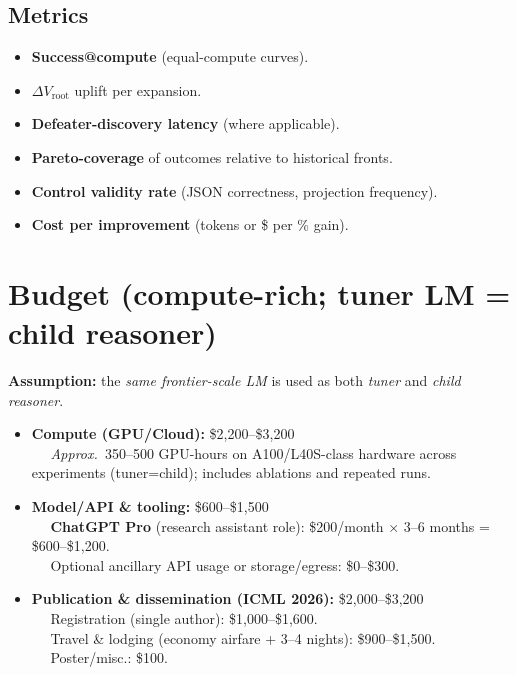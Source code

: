 \documentclass[11pt]{article}
\begin{document}
\subsection{Metrics}
\begin{itemize}[leftmargin=1.2em]
  \item \textbf{Success@compute} (equal-compute curves).
  \item \textbf{$\Delta V_{\text{root}}$} uplift per expansion.
  \item \textbf{Defeater-discovery latency} (where applicable).
  \item \textbf{Pareto-coverage} of outcomes relative to historical fronts.
  \item \textbf{Control validity rate} (JSON correctness, projection frequency).
  \item \textbf{Cost per improvement} (tokens or \$ per \% gain).
\end{itemize}

\section{Budget (compute-rich; tuner LM = child reasoner)}
\textbf{Assumption:} the \emph{same frontier-scale LM} is used as both \emph{tuner} and \emph{child reasoner}.

\begin{itemize}[leftmargin=1.2em]
  \item \textbf{Compute (GPU/Cloud):} \$2{,}200--\$3{,}200 \\
  $\quad$ \emph{Approx.\ }350--500 GPU-hours on A100/L40S-class hardware across experiments (tuner=child); includes ablations and repeated runs.

  \item \textbf{Model/API \& tooling:} \$600--\$1{,}500 \\
  $\quad$ \textbf{ChatGPT Pro} (research assistant role): \$200/month $\times$ 3--6 months = \$600--\$1{,}200. \\
  $\quad$ Optional ancillary API usage or storage/egress: \$0--\$300.

  \item \textbf{Publication \& dissemination (ICML 2026):} \$2{,}000--\$3{,}200 \\
  $\quad$ Registration (single author): \$1{,}000--\$1{,}600. \\
  $\quad$ Travel \& lodging (economy airfare + 3--4 nights): \$900--\$1{,}500. \\
  $\quad$ Poster/misc.: \$100.
\end{itemize}
\end{document}
